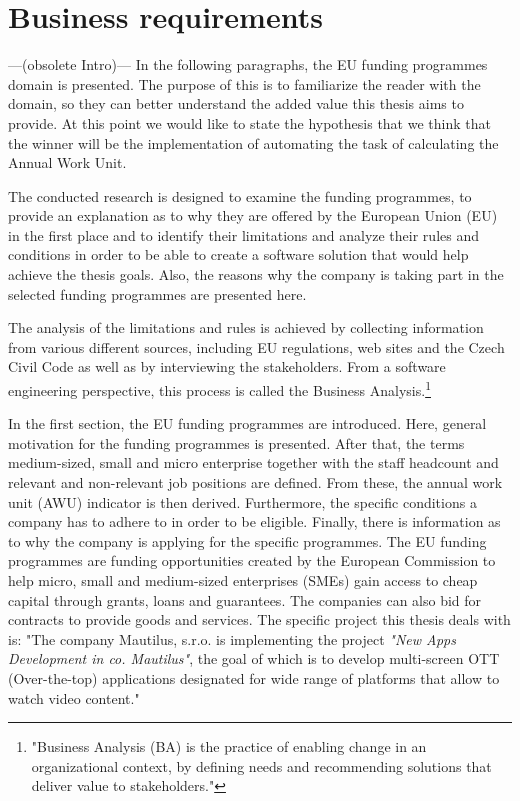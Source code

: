 \documentclass[12pt,oneside]{fithesis2}
\begin{document}
\chapter{Business requirements}\label{hypothesis}
---(obsolete Intro)---
In the following paragraphs, the EU funding programmes domain is presented. The purpose of this is to familiarize the reader with the domain, so they can better understand the added value this thesis aims to provide. At this point we would like to state the hypothesis that we think that the winner will be the implementation of automating the task of calculating the Annual Work Unit.
\par
The conducted research is designed to examine the funding programmes, to provide an explanation as to why they are offered by the European Union (EU) in the first place and to identify their limitations and analyze their rules and conditions in order to be able to create a software solution that would help achieve the thesis goals. Also, the reasons why the company is taking part in the selected funding programmes are presented here.
\par
The analysis of the limitations and rules is achieved by collecting information from various different sources, including EU regulations, web sites and the Czech Civil Code as well as by interviewing the stakeholders. From a software engineering perspective, this process is called the Business Analysis.\footnote{"Business Analysis (BA) is the practice of enabling change in an organizational context, by defining needs and recommending solutions that deliver value to stakeholders."\cite{business-analysis}}
\par
In the first section, the EU funding programmes are introduced. Here, general motivation for the funding programmes is presented. After that, the terms medium-sized, small and micro enterprise together with the staff headcount and relevant and non-relevant job positions are defined. From these, the annual work unit (AWU) indicator is then derived. Furthermore, the specific conditions a company has to adhere to in order to be eligible. Finally, there is information as to why the company is applying for the specific programmes.
\newpage
The EU funding programmes are funding opportunities created by the European Commission to help micro, small and medium-sized enterprises (SMEs) gain access to cheap capital through grants, loans and guarantees. The companies can also bid for contracts to provide goods and services.
The specific project this thesis deals with is: "The company Mautilus, s.r.o. is implementing the project \textit{"New Apps Development in co. Mautilus"}, the goal of which is to develop multi-screen OTT (Over-the-top) applications designated for wide range of platforms that allow to watch video content." \cite{mau-eu-subsidy}
\end{document}
